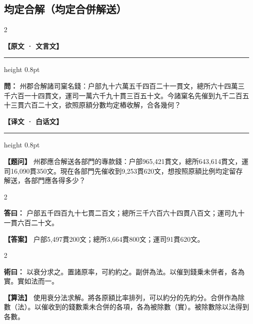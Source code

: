 \documentclass[11pt,a4paper]{article}
\newcommand{\ClassicalQuestion}[1]{\par\noindent\textbf{\color{problemcolor}問：}#1\par}
\newcommand{\ClassicalAnswer}[1]{\par\noindent\textbf{\color{answercolor}答曰：}#1\par}
\newcommand{\ClassicalMethod}[1]{\par\noindent\textbf{\color{methodcolor}術曰：}#1\par}
\newcommand{\ModernQuestion}[1]{\par\noindent\textbf{\color{modernlabel}【题问】}#1\par}
\newcommand{\ModernAnswer}[1]{\par\noindent\textbf{\color{answercolor}【答案】}#1\par}
\newcommand{\ModernMethod}[1]{\par\noindent\textbf{\color{methodcolor}【算法】}#1\par}
\newcommand{\ClassicalHeader}{%
  \begin{center}\textbf{\color{headerclassical}【原文 · 文言文】}\end{center}
  \vspace{-0.5em}
  \hrule height 0.8pt
  \vspace{0.5em}
}
\newcommand{\ModernHeader}{%
  \begin{center}\textbf{\color{headermodern}【译文 · 白话文】}\end{center}
  \vspace{-0.5em}
  \hrule height 0.8pt
  \vspace{0.5em}
}
\begin{document}
\subsection*{\color{sectioncolor}均定合解（均定合併解送）}

\begin{paracol}{2}

\ClassicalHeader

\ClassicalQuestion{%
州郡合解諸司窠名錢：户部九十六萬五千四百二十一貫文，總所六十四萬三千六百一十四貫文，運司一萬六千九十貫三百五十文。今諸窠名先催到九千二百五十三貫六百二十文，欲照原額分數均定樁收解，合各幾何？}

\switchcolumn

\ModernHeader

\ModernQuestion{%
州郡應合解送各部門的專款錢：户部965,421貫文，總所643,614貫文，運司16,090貫350文。現在各部門先催收到9,253貫620文，想按照原額比例均定留存解送，各部門應各得多少？
}

\end{paracol}

\begin{paracol}{2}

\ClassicalAnswer{%
户部五千四百九十七貫二百文；總所三千六百六十四貫八百文；運司九十一貫六百二十文。}

\switchcolumn

\ModernAnswer{%
户部5,497貫200文；總所3,664貫800文；運司91貫620文。}

\end{paracol}

\begin{paracol}{2}

\ClassicalMethod{%
以衰分求之。置諸原率，可約約之。副併為法。以催到錢乗未併者，各為實。實如法而一。}

\switchcolumn

\ModernMethod{%
使用衰分法求解。將各原額比率排列，可以約分的先約分。合併作為除數（法）。以催收到的錢數乘未合併的各項，各為被除數（實）。被除數除以法得到各數。
}

\end{paracol}
\end{document}
